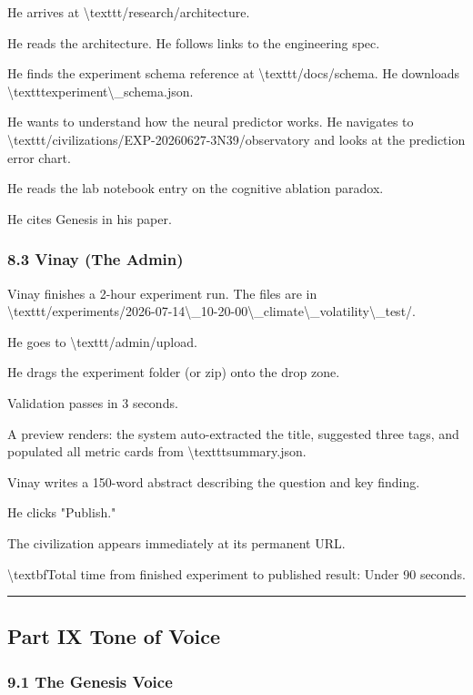 \documentclass[11pt,a4paper]{article}
\begin{document}
He arrives at \textbackslash{}texttt{/research/architecture}.

He reads the architecture. He follows links to the engineering spec.

He finds the experiment schema reference at \textbackslash{}texttt{/docs/schema}. He downloads \textbackslash{}texttt{experiment\textbackslash{}\_schema.json}.

He wants to understand how the neural predictor works. He navigates to \textbackslash{}texttt{/civilizations/EXP-20260627-3N39/observatory} and looks at the prediction error chart.

He reads the lab notebook entry on the cognitive ablation paradox.

He cites Genesis in his paper.

\subsubsection*{8.3 Vinay (The Admin)}

Vinay finishes a 2-hour experiment run. The files are in \textbackslash{}texttt{/experiments/2026-07-14\textbackslash{}\_10-20-00\textbackslash{}\_climate\textbackslash{}\_volatility\textbackslash{}\_test/}.

He goes to \textbackslash{}texttt{/admin/upload}.

He drags the experiment folder (or zip) onto the drop zone.

Validation passes in 3 seconds.

A preview renders: the system auto-extracted the title, suggested three tags, and populated all metric cards from \textbackslash{}texttt{summary.json}.

Vinay writes a 150-word abstract describing the question and key finding.

He clicks "Publish."

The civilization appears immediately at its permanent URL.

\textbackslash{}textbf{Total time from finished experiment to published result:} Under 90 seconds.

\noindent\rule{\textwidth}{0.4pt}

\subsection*{Part IX  Tone of Voice}

\subsubsection*{9.1 The Genesis Voice}
\end{document}
